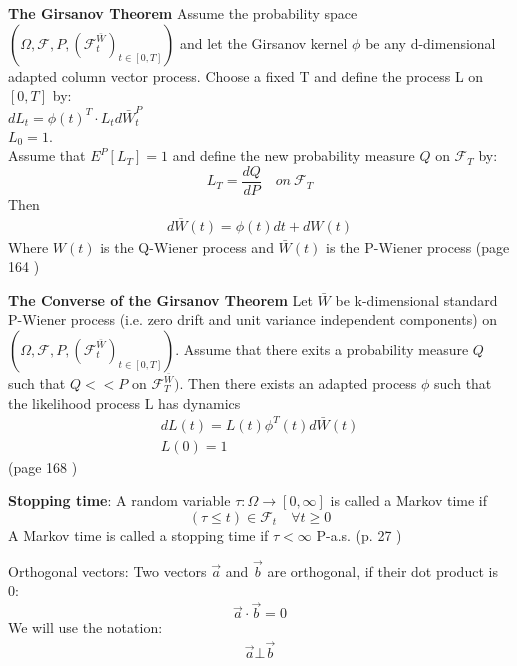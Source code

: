 \begin{theorem}\label{Girsanov}
\textbf{The Girsanov Theorem} 
Assume the probability space $(\Omega, \mathcal{F}, P, (\mathcal{F}_t^{\bar{W}})_{t \in [0,T]})$ and let the Girsanov kernel $\phi$ be any d-dimensional adapted column vector process. Choose a fixed T and define the process L on $[0,T]$ by:\\
$dL_t=\phi(t)^T\cdot L_t d\bar{W}_t^P$\\
$L_0=1$.\\
Assume that $E^P[L_T]=1$ and define the new probability measure $Q$ on $\mathcal{F}_T$ by:\\
$$L_T=\frac{dQ}{dP} \quad on \ \mathcal{F}_T$$
Then
\begin{align}
d\bar{W}(t)=\phi(t)dt + dW(t)
\end{align}
Where $W(t)$ is the Q-Wiener process and $\bar{W}(t)$ is the P-Wiener process
(page 164 \parencite{finKont})
\end{theorem}

\begin{theorem}\label{ConverseGirsanov}
\textbf{The Converse of the Girsanov Theorem} Let $\bar{W}$ be k-dimensional standard P-Wiener process (i.e. zero drift and unit variance independent components) on $(\Omega,\mathcal{F}, P, (\mathcal{F}_t^{\bar{W}})_{t \in [0,T]})$. Assume that there exits a probability measure $Q$ such that $Q<<P$ on $\mathcal{F}_T^{\bar{W}})$. Then there exists an adapted process $\phi$ such that the likelihood process L has dynamics
\begin{align*}
dL(t)=L(t)\phi^T(t)d\bar{W}(t)\\
L(0)=1
\end{align*}
(page 168 \parencite{finKont})
\end{theorem}

\theoremstyle{definition}
\begin{definition}{\textbf{Stopping time}:}\label{StoppingTime}
A random variable $\tau:\Omega \to [0,\infty]$ is called a Markov time if 
$$(\tau \leq t)\in \mathcal{F}_{t} \quad \forall t \geq 0 $$
A Markov time is called a stopping time if $\tau<\infty$ P-a.s.
(p. 27 \parencite{Shiryaev06})
\end{definition}

\theoremstyle{definition}
\begin{definition}{Orthogonal vectors: }\label{OrthogonalVec}
Two vectors $\overrightarrow{a}$ and $\overrightarrow{b}$ are orthogonal, if their dot product is 0:
$$\overrightarrow{a} \cdot \overrightarrow{b} = 0$$
We will use the notation:
\begin{equation}
\begin{split}
\overrightarrow{a} \bot \overrightarrow{b}
\end{split}
\end{equation}
\end{definition}

